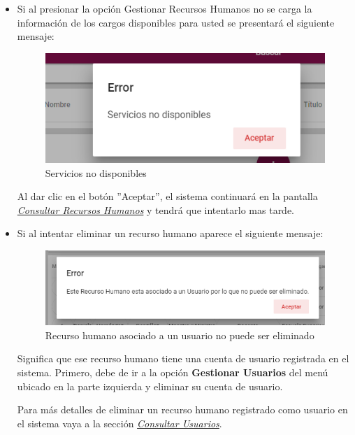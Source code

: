           \begin{itemize}
                \item Si al  presionar la opción Gestionar Recursos Humanos no se carga la información de los cargos disponibles para usted se presentará el siguiente mensaje:

             \begin{figure}[H]
                \centering
                \includegraphics[width=0.4\linewidth]{images/SP1/MSGSN}
                \caption{Servicios no disponibles}
                \label{SND}

            \end{figure}

                    Al dar clic en el botón ''Aceptar'', el sistema continuará en la pantalla  \hyperlink{consultarRH}{\textit{Consultar Recursos Humanos}} y tendrá que intentarlo  mas tarde.


              \item Si al intentar eliminar un recurso humano aparece el siguiente mensaje:
                \begin{figure}[H]
                   \centering
                   \includegraphics[width=0.4\linewidth]{images/SP1/MSG56}
                    \caption{Recurso humano asociado a un usuario no puede ser eliminado}
                   \label{mensaje56}
                \end{figure}

                Significa que ese recurso humano tiene una cuenta de usuario registrada en el sistema. Primero, debe de ir a la opción \textbf{Gestionar Usuarios} del menú ubicado en la parte izquierda y eliminar su cuenta de usuario.

                Para más detalles de eliminar un recurso humano registrado como usuario en el sistema vaya a la sección \hyperlink{consultarUs}{\textit{Consultar Usuarios}}.


           \end{itemize}

